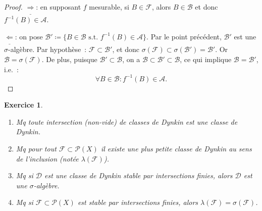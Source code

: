 \documentclass{article}
\newtheorem{ex}{Exercice}[section]
\theoremstyle{definition}
\newcommand{\st}{\text{ s.t. }}
\begin{document}
\begin{proof} $\underline \Rightarrow$: en supposant $f$ mesurable, si $B \in \mathcal F$, alors $B \in \mathcal B$ et donc $f^{-1}(B) \in \mathcal A$.

$\underline \Leftarrow$: on pose $\mathcal B' \coloneqq \{B \in \mathcal B \st f^{-1}(B) \in \mathcal A\}$. Par le point précédent, $\mathcal B'$ est une $\sigma$-algèbre.
Par hypothèse~: $\mathcal F \subset \mathcal B'$, et donc $\sigma(\mathcal F) \subset \sigma(\mathcal B') = \mathcal B'$. Or $\mathcal B = \sigma(\mathcal F)$. De plus,
puisque $\mathcal B' \subset \mathcal B$, on a $\mathcal B \subset \mathcal B' \subset \mathcal B$, ce qui implique $\mathcal B = \mathcal B'$, i.e.~:
\[\forall B \in \mathcal B : f^{-1}(B) \in \mathcal A.\]
\end{proof}

\begin{ex}~
\begin{enumerate}
	\item Mq toute intersection (non-vide) de classes de Dynkin est une classe de Dynkin.
	\item Mq pour tout $\mathcal F \subset \mathcal P(X)$ il existe une plus petite classe de Dynkin au sens de l'inclusion (notée $\lambda(\mathcal F)$).
	\item Mq si $\mathcal D$ est une classe de Dynkin stable par intersections finies, alors $\mathcal D$ est une $\sigma$-algèbre.
	\item Mq si $\mathcal F \subset \mathcal P(X)$ est stable par intersections finies, alors $\lambda(\mathcal F) = \sigma(\mathcal F)$.
\end{enumerate}
\end{ex}
\end{document}

